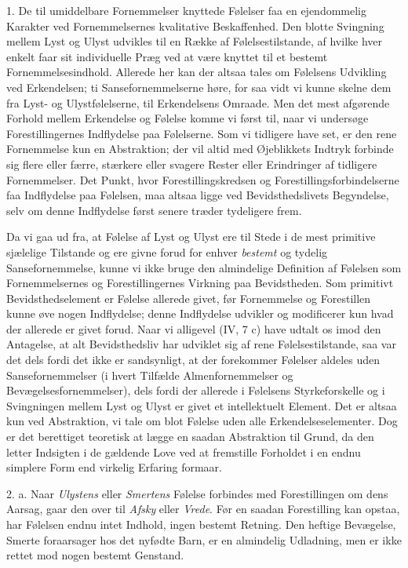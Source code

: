 \documentclass[12pt,a4paper,openany]{book}
\newcommand{\opage}[1]{\marginnote{\footnotesize\textit{[#1]}}}
\begin{document}
1. De til umiddelbare Fornemmelser knyttede Følelser faa en ejendommelig
Karakter ved Fornemmelsernes kvalitative Beskaffenhed. Den blotte
Svingning mellem Lyst og Ulyst udvikles til en Række af
Følelsestilstande, af hvilke hver enkelt faar sit individuelle Præg ved
at være knyttet til et bestemt Fornemmelsesindhold. Allerede her kan der
altsaa tales om Følelsens Udvikling ved Erkendelsen; ti
Sansefornemmelserne høre, for saa vidt vi kunne skelne dem fra Lyst- og
Ulystfølelserne, til Erkendelsens Omraade. Men det mest afgørende
Forhold mellem Erkendelse og Følelse komme vi først til, naar vi
undersøge Forestillingernes Indflydelse paa Følelserne. Som vi tidligere
have set, er den rene Fornemmelse kun en Abstraktion; der vil altid med
Øjeblikkets Indtryk forbinde sig flere eller færre, stærkere eller
svagere Rester eller Erindringer af tidligere Fornemmelser. Det Punkt,
hvor Forestillingskredsen og Forestillingsforbindelserne faa Indflydelse
paa Følelsen, maa altsaa ligge ved Bevidsthedslivets Begyndelse, selv om
denne Indflydelse først senere træder tydeligere frem.

Da vi gaa ud fra, at Følelse af Lyst og Ulyst ere til Stede i de mest
primitive sjælelige Tilstande og ere givne forud for enhver
\emph{bestemt} og tydelig Sansefornemmelse, kunne vi ikke bruge den
almindelige Definition af Følelsen som Fornemmelsernes og
Forestillingernes Virkning paa Bevidstheden. Som primitivt
Bevidsthedselement er Følelse allerede givet, før Fornemmelse og
Forestillen kunne øve nogen Indflydelse; denne Indflydelse udvikler og
modificerer kun hvad
\opage{282}der allerede er givet forud. Naar vi alligevel (IV, 7 c) have
udtalt os imod den Antagelse, at alt Bevidsthedsliv har udviklet sig af
rene Følelsestilstande, saa var det dels fordi det ikke er sandsynligt,
at der forekommer Følelser aldeles uden Sansefornemmelser (i hvert
Tilfælde Almenfornemmelser og Bevægelsesfornemmelser), dels fordi der
allerede i Følelsens Styrkeforskelle og i Svingningen mellem Lyst og
Ulyst er givet et intellektuelt Element. Det er altsaa kun ved
Abstraktion, vi tale om blot Følelse uden alle Erkendelseselementer. Dog
er det berettiget teoretisk at lægge en saadan Abstraktion til Grund, da
den letter Indsigten i de gældende Love ved at fremstille Forholdet i en
endnu simplere Form end virkelig Erfaring formaar.

2. a. Naar \emph{Ulystens} eller \emph{Smertens} Følelse forbindes med
Forestillingen om dens Aarsag, gaar den over til \emph{Afsky} eller
\emph{Vrede}. Før en saadan Forestilling kan opstaa, har Følelsen endnu
intet Indhold, ingen bestemt Retning. Den heftige Bevægelse, Smerte
foraarsager hos det nyfødte Barn, er en almindelig Udladning, men er
ikke rettet mod nogen bestemt Genstand.
\end{document}
